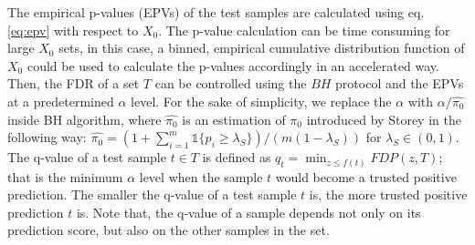 \documentclass{article}
\newcommand{\mathone}{\mathds{1}}
\begin{document}
The empirical  p-values (EPVs) of the test samples are calculated using eq. \ref{eq:epv} with respect to $X_0$. The p-value calculation can be time consuming for large $X_0$ sets, in this case, a binned, empirical cumulative distribution function of $X_0$ could be used to calculate the p-values accordingly in an accelerated way. Then, the FDR of a set $T$ can be controlled using the $BH$ protocol and the EPVs at a predetermined $\alpha$ level. For the sake of simplicity, we replace the $\alpha$ with $\alpha/\hat{\pi_0}$ inside BH algorithm, where $\hat{\pi_0}$ is an estimation of $\pi_0$ introduced by Storey \cite{storey2004strong} in the following way: $\hat{\pi_0} = (1+\sum_{i=1}^m \mathone\{p_i\ge\lambda_S\} )/(m(1-\lambda_S))$ for $\lambda_S\in (0,1)$. The q-value of a test sample $t\in T$ is defined as $q_t=\min_{z\le f(t)}FDP( z, T )$; that is the minimum $\alpha$ level when the sample $t$ would become a trusted positive prediction. 
The smaller the q-value of a test sample $t$ is, the more trusted positive prediction $t$ is. Note that, the q-value of a sample depends not only on its prediction score, but also on the other samples in the set. 
%
\end{document}

